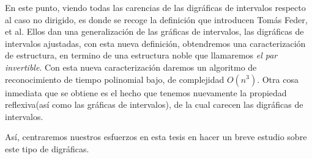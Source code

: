 En este punto, viendo todas las carencias de las digráficas de intervalos respecto al caso no dirigido, es donde se recoge la definición que introducen Tomás Feder, et al. Ellos dan una generalización de las gráficas de intervalos, las digráficas de intervalos ajustadas, con esta nueva definición, obtendremos una caracterización de estructura, en termino de una estructura noble que llamaremos \textit{el par invertible}. Con esta nueva caracterización daremos un algoritmo de reconocimiento de tiempo polinomial bajo, de complejidad $O(n^3)$. Otra cosa inmediata que se obtiene es el hecho que tenemos nuevamente la propiedad reflexiva(así como las gráficas de intervalos), de la cual carecen las digráficas de intervalos.

Así, centraremos nuestros esfuerzos en esta tesis en hacer un breve estudio sobre este tipo de digráficas.